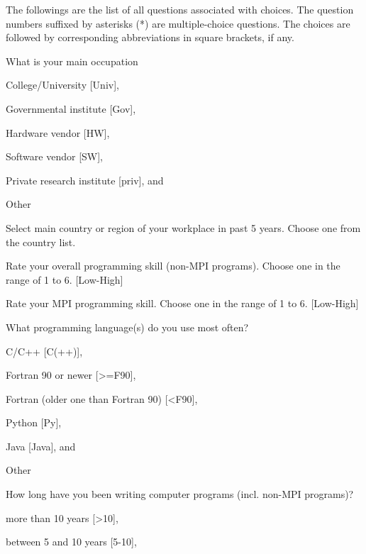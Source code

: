 \documentclass[preprint,5p,times]{elsarticle}
\begin{document}
{The followings are the list of all questions associated with
choices. The question numbers suffixed by asterisks (*) are
multiple-choice questions. The choices are followed by corresponding
abbreviations in square brackets, if any.
{\footnotesize
\vspace{5mm}
  \begin{description}[leftmargin=3mm]
    \vspace{-1mm}
  \item[Q1:] What is your main occupation
    \begin{inparaenum}[{\bf C}1)]
    \item College/University [Univ],
    \item Governmental institute [Gov],
    \item Hardware vendor [HW],
    \item Software vendor [SW],
    \item Private research institute [priv], and
    \item Other
    \end{inparaenum}
  \item[Country:] \hspace{3mm}Select main country or region of your workplace in past 5 years.
    Choose one from the country list.
  \item[Q2:] Rate your overall programming skill (non-MPI programs).
    Choose one in the range of 1 to 6. [Low-High]
  \item[Q3:] Rate your MPI programming skill.
    Choose one in the range of 1 to 6. [Low-High]
  \item[Q4*:] What programming language(s) do you use most often?
    \begin{inparaenum}[{\bf C}1)]
    \item C/C++ [C(++)],
    \item Fortran 90 or newer [\textgreater=F90],
    \item Fortran (older one than Fortran 90) [\textless F90],
    \item Python [Py],
    \item Java [Java], and
    \item Other
    \end{inparaenum}
  \item[Q5:] How long have you been writing computer programs (incl. non-MPI programs)?
    \begin{inparaenum}[{\bf C}1)]
    \item more than 10 years [\textgreater10],
    \item between 5 and 10 years [5-10],

\end{inparaenum}
\end{description}}}
\end{document}
